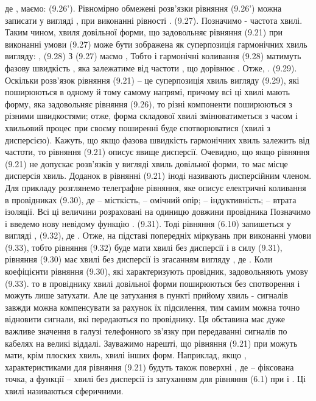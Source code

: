 де  , маємо:
                                (9.26’).
Рівномірно обмежені розв’язки рівняння (9.26’) можна записати у вигляді  , при виконанні рівності   .           (9.27).
Позначимо   - частота хвилі.
Таким чином, хвиля довільної форми, що задовольняє рівняння (9.21) при виконанні умови (9.27) може бути зображена як суперпозиція гармонічних хвиль вигляду:  ,                             (9.28) 
З (9.27) маємо               ,
Тобто   і гармонічні коливання (9.28) матимуть фазову швидкість  , яка залежатиме від частоти  , що дорівнює     .
Отже,  .                        (9.29).
Оскільки розв’язок рівняння (9.21) – це суперпозиція хвиль вигляду (9.29), які поширюються в одному й тому самому напрямі, причому всі ці хвилі мають форму, яка задовольняє рівняння (9.26), то різні компоненти поширюються з різними швидкостями; отже, форма складової хвилі   змінюватиметься з часом   і хвильовий процес при своєму поширенні буде спотворюватися (хвилі з дисперсією). Кажуть, що якщо фазова швидкість гармонічних хвиль залежить від частоти, то рівняння (9.21) описує явище дисперсії.
Очевидно, що якщо рівняння (9.21) не допускає розв’язків у вигляді хвиль довільної форми, то має місце дисперсія хвиль. Доданок   в рівнянні (9.21) іноді називають дисперсійним членом.
Для прикладу розглянемо телеграфне рівняння, яке описує електричні коливання в провідниках
            (9.30),
де   – місткість,   – омічний опір;   – індуктивність;   – втрата ізоляції. Всі ці величини розраховані на одиницю довжини провідника Позначимо   і введемо нову невідому функцію
 .                              (9.31).
Тоді рівняння (6.10) запишеться у вигляді
 ,                      (9.32),
де   .
Отже, на підставі попередніх міркувань при виконанні умови 
                                     (9.33), тобто   рівняння (9.32) буде мати хвилі без дисперсії і в силу (9.31), рівняння (9.30) має хвилі без дисперсії із згасанням вигляду
 , де  .
Коли коефіцієнти рівняння (9.30), які характеризують провідник, задовольняють умову (9.33). то в провіднику хвилі довільної форми поширюються без спотворення і можуть лише затухати. Але це затухання в пункті прийому хвиль - сигналів завжди можна компенсувати за рахунок їх підсилення, тим самим можна точно відновити сигнали, які передаються по провіднику.
Ця обставина має дуже важливе значення в галузі телефонного зв’язку при передаванні сигналів по кабелях на великі віддалі.
Зауважимо нарешті, що рівняння (9.21) при   можуть мати, крім плоских хвиль, хвилі інших форм. Наприклад, якщо  , характеристиками для рівняння (9.21) будуть також поверхні
 , де   – фіксована точка, а функції   – хвилі без дисперсії із затуханням для рівняння (6.1) при   і  . Ці хвилі називаються сферичними.



